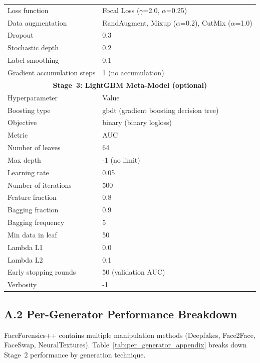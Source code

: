 \begin{table}[h]
{\begin{tabular}{@{}ll@{}}
    Loss function & Focal Loss ($\gamma$=2.0, $\alpha$=0.25) \\
    Data augmentation & RandAugment, Mixup ($\alpha$=0.2), CutMix ($\alpha$=1.0) \\
    Dropout & 0.3 \\
    Stochastic depth & 0.2 \\
    Label smoothing & 0.1 \\
    Gradient accumulation steps & 1 (no accumulation) \\
    \midrule
    \multicolumn{2}{c}{\textbf{Stage~3: LightGBM Meta-Model (optional)}} \\
    \midrule
    Hyperparameter & Value \\
    \midrule
    Boosting type & gbdt (gradient boosting decision tree) \\
    Objective & binary (binary logloss) \\
    Metric & AUC \\
    Number of leaves & 64 \\
    Max depth & -1 (no limit) \\
    Learning rate & 0.05 \\
    Number of iterations & 500 \\
    Feature fraction & 0.8 \\
    Bagging fraction & 0.9 \\
    Bagging frequency & 5 \\
    Min data in leaf & 50 \\
    Lambda L1 & 0.0 \\
    Lambda L2 & 0.1 \\
    Early stopping rounds & 50 (validation AUC) \\
    Verbosity & -1 \\
    \bottomrule
  \end{tabular}}
\end{table}

\subsection*{A.2 Per-Generator Performance Breakdown}

FaceForensics++ contains multiple manipulation methods (Deepfakes, Face2Face, FaceSwap, NeuralTextures). Table~\ref{tab:per_generator_appendix} breaks down Stage~2 performance by generation technique.

